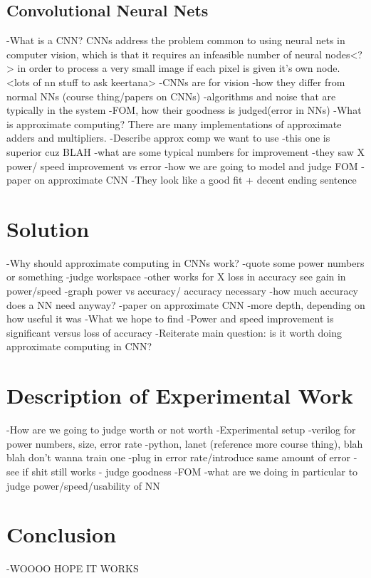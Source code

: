 \documentclass[conference]{IEEEtran}
\begin{document}
\subsection{Convolutional Neural Nets}
-What is a CNN? 
CNNs address the problem common to using neural nets in computer vision, which is that it requires an infeasible number of neural nodes<?> in order to process a very small image if each pixel is given it's own node. <lots of nn stuff to ask keertana>
	-CNNs are for vision
	-how they differ from normal NNs (course thing/papers on CNNs)
-algorithms and noise that are typically in the system
-FOM, how their goodness is judged(error in NNs)
-What is approximate computing?
There are many implementations of approximate adders and multipliers. 
	-Describe approx comp we want to use
		-this one is superior cuz BLAH
	-what are some typical numbers for improvement
		-they saw X power/ speed improvement vs error
	-how we are going to model and judge FOM
-paper on approximate CNN
-They look like a good fit + decent ending sentence

\section{Solution}
-Why should approximate computing in CNNs work?
	-quote some power numbers or something
-judge workspace
		-other works for X loss in accuracy see gain in power/speed
		-graph power vs accuracy/ accuracy necessary
			-how much accuracy does a NN need anyway?
-paper on approximate CNN
	-more depth, depending on how useful it was
-What we hope to find
	-Power and speed improvement is significant versus loss of accuracy
	-Reiterate main question: is it worth doing approximate computing in CNN?

\section{Description of Experimental Work}
-How are we going to judge worth or not worth
-Experimental setup
	-verilog for power numbers, size, error rate
-python, lanet (reference more course thing), blah blah don’t wanna train one
	-plug in error rate/introduce same amount of error
-see if shit still works
	- judge goodness
-FOM
	-what are we doing in particular to judge power/speed/usability of NN


\section{Conclusion}
-WOOOO HOPE IT WORKS
\end{document}
